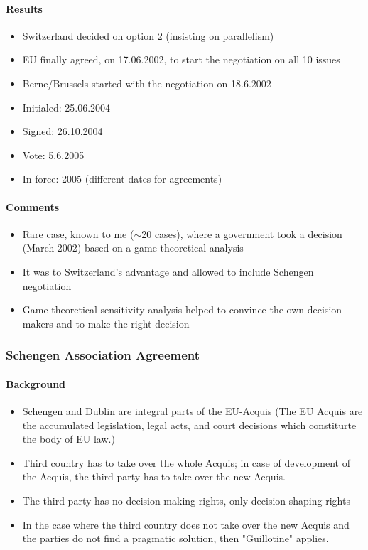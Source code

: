 \paragraph{Results}

\begin{itemize}
    \item Switzerland decided on option 2 (insisting on parallelism)
    \item EU finally agreed, on 17.06.2002, to start the negotiation on all 10 issues
    \item Berne/Brussels started with the negotiation on 18.6.2002
    \item Initialed: 25.06.2004
    \item Signed: 26.10.2004
    \item Vote: 5.6.2005
    \item In force: 2005 (different dates for agreements)
\end{itemize}

\paragraph{Comments}
\begin{itemize}
    \item Rare case, known to me ($\sim$20 cases), where a government took
        a decision (March 2002) based on a game theoretical analysis
    \item It was to Switzerland's advantage and allowed to include Schengen
        negotiation
    \item Game theoretical sensitivity analysis helped to convince the own
        decision makers and to make the right decision
\end{itemize}


\subsubsection{Schengen Association Agreement}

\paragraph{Background}

\begin{itemize}
    \item Schengen and Dublin are integral parts of the EU-Acquis
        (The EU Acquis are the accumulated legislation, legal acts, and
        court decisions which constiturte the body of EU law.)
    \item Third country has to take over the whole Acquis; in case of
        development of the Acquis, the third party has to take over the new
        Acquis.
    \item The third party has no decision-making rights, only decision-shaping rights
    \item In the case where the third country does not take over the new Acquis and
        the parties do not find a pragmatic solution, then "Guillotine" applies.
\end{itemize}

